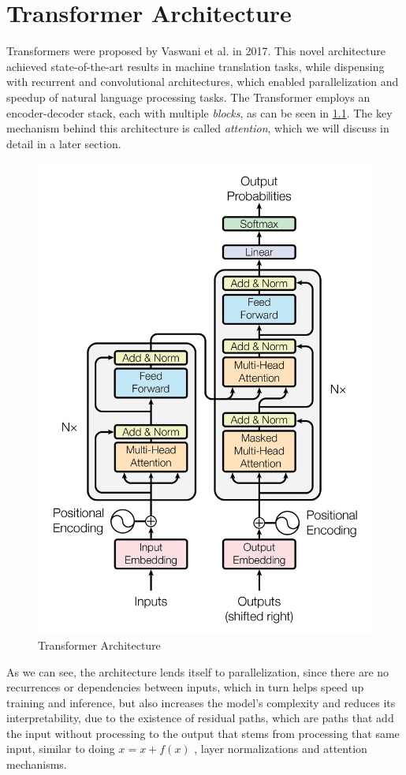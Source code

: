 \chapter{Transformer Architecture}
Transformers \cite{attention_is_all_you_need} were proposed by Vaswani et al. in 2017. This novel architecture achieved state-of-the-art results in machine translation tasks, while dispensing with recurrent and convolutional architectures, which enabled parallelization and speedup of natural language processing tasks. The Transformer employs an encoder-decoder stack, each with multiple \emph{blocks}, as can be seen in \ref{fig:transformer}. The key mechanism behind this architecture is called \emph{attention}, which we will discuss in detail in a later section.

\begin{figure}[h]
    \centering
    \includegraphics[width=0.6\linewidth]{docs/figs/transformer.png}
    \caption{Transformer Architecture \cite{attention_is_all_you_need}}
    \label{fig:transformer}
\end{figure}

As we can see, the architecture lends itself to parallelization, since there are no recurrences or dependencies between inputs, which in turn helps speed up training and inference, but also increases the model's complexity and reduces its interpretability, due to the existence of residual paths, which are paths that add the input without processing to the output that stems from processing that same input, similar to doing $x = x + f(x)$ , layer normalizations and attention mechanisms.

